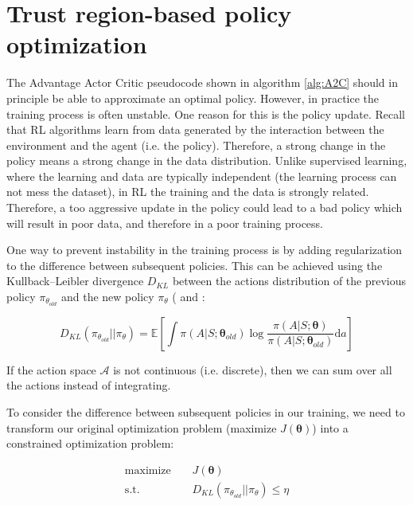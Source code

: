 \documentclass[twoside,twocolumn]{article}
\begin{document}
\section{Trust region-based policy optimization}

The Advantage Actor Critic pseudocode shown in algorithm \ref{alg:A2C} should in principle be able to approximate an optimal policy. However, in practice the training process is often unstable. One reason for this is the policy update. Recall that RL algorithms learn from data generated by the interaction between the environment and the agent (i.e. the policy). Therefore, a strong change in the policy means a strong change in the data distribution. Unlike supervised learning, where the learning and data are typically independent (the learning process can not mess the dataset), in RL the training and the data is strongly related. Therefore, a too aggressive update in the policy could lead to a bad policy which will result in poor data, and therefore in a poor training process.

One way to prevent instability in the training process is by adding regularization to the difference between subsequent policies. This can be achieved using the Kullback–Leibler divergence $D_{KL}$ between the actions distribution of the previous policy $\pi_{\theta_{old}}$ and the new policy $\pi_{\theta}$ (\cite{intro2RL} and \cite{Aclecture}:

\begin{equation*}
    D_{KL}(\pi_{\theta_{old}} || \pi_{\theta}) = \mathbb{E} \left[
    \int \pi(A|S;\boldsymbol{\theta}_{old})
    \log{\frac{\pi(A|S;\boldsymbol{\theta})}{\pi(A|S;\boldsymbol{\theta}_{old})}}\text{d}a
    \right]
\end{equation*}

\noindent If the action space $\mathcal{A}$ is not continuous (i.e. discrete), then we can sum over all the actions instead of integrating.

To consider the difference between subsequent policies in our training, we need to transform our original optimization problem (maximize $J(\boldsymbol{\theta})$) into a constrained optimization problem:

\begin{equation}
  \begin{split}
    \text{maximize} \ \ \ \ \ &J(\boldsymbol{\theta})\\
    \text{s.t.} \ \ \ \ \ &D_{KL}(\pi_{\theta_{old}} || \pi_{\theta}) \leq \eta
  \end{split}
  \label{eq:c_opt}
\end{equation}
\end{document}
